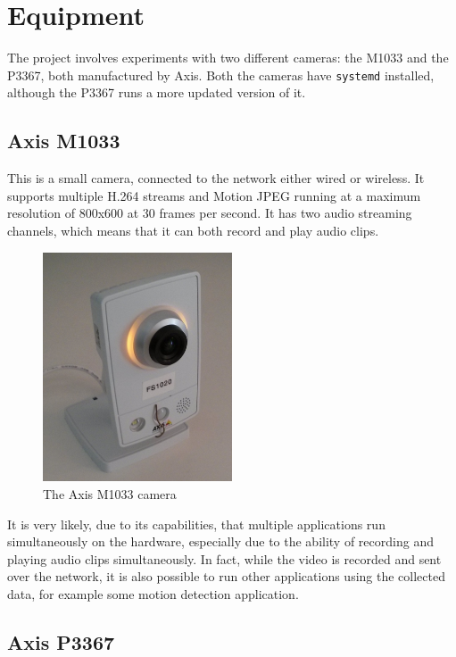 \documentclass[nobiblatex]{LTHthesis}
\begin{document}
\section{Equipment}
The project involves experiments with two different cameras: the M1033 and 
the P3367, both manufactured by Axis. Both the cameras have \texttt{systemd}
installed, although the P3367 runs a more updated version of it.

\subsection{Axis M1033}

This is a small camera, connected to the network either wired or wireless. 
It supports multiple H.264 streams and Motion JPEG running at a maximum
resolution of 800x600 at 30 frames per second. It has two audio streaming
channels, which means that it can both record and play audio clips. ~\cite{m1033} 

\begin{figure}[h]
    \centering
    \includegraphics[width=0.5\textwidth]{m1033}
    \caption{The Axis M1033 camera}
    \label{fig:M1033}
\end{figure}

It is very likely, due to its capabilities, that multiple applications run
simultaneously on the hardware, especially due to the ability of recording 
and playing audio clips simultaneously. In fact, while the video is recorded
and sent over the network, it is also possible to run other applications
using the collected data, for example some motion detection application.

\subsection{Axis P3367}
\end{document}
